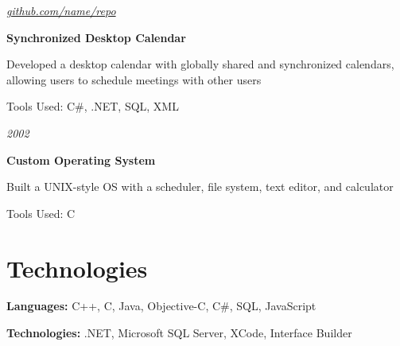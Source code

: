 \documentclass[10pt, letterpaper]{article}
\begin{document}
        \vspace{0.2 cm}

        \begin{twocolentry}{
            
            
        \textit{\href{https://github.com/sinaatalay/rendercv}{github.com/name/repo}}}
            \textbf{Synchronized Desktop Calendar}
        \end{twocolentry}

        \vspace{0.10 cm}
        \begin{onecolentry}
            \begin{highlights}
                \item Developed a desktop calendar with globally shared and synchronized calendars, allowing users to schedule meetings with other users
                \item Tools Used: C\#, .NET, SQL, XML
            \end{highlights}
        \end{onecolentry}


        \vspace{0.2 cm}

        \begin{twocolentry}{
            
            
        \textit{2002}}
            \textbf{Custom Operating System}
        \end{twocolentry}

        \vspace{0.10 cm}
        \begin{onecolentry}
            \begin{highlights}
                \item Built a UNIX-style OS with a scheduler, file system, text editor, and calculator
                \item Tools Used: C
            \end{highlights}
        \end{onecolentry}



    
    \section{Technologies}



        
        \begin{onecolentry}
            \textbf{Languages:} C++, C, Java, Objective-C, C\#, SQL, JavaScript
        \end{onecolentry}

        \vspace{0.2 cm}

        \begin{onecolentry}
            \textbf{Technologies:} .NET, Microsoft SQL Server, XCode, Interface Builder
        \end{onecolentry}


    
\end{document}
